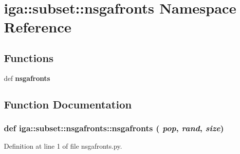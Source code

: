 \section{iga::subset::nsgafronts Namespace Reference}
\label{namespaceiga_1_1subset_1_1nsgafronts}


\subsection*{Functions}
\begin{CompactItemize}
\item 
def {\bf nsgafronts}
\end{CompactItemize}


\subsection{Function Documentation}
\subsubsection{\setlength{\rightskip}{0pt plus 5cm}def iga::subset::nsgafronts::nsgafronts ( {\em pop},  {\em rand},  {\em size})}\label{namespaceiga_1_1subset_1_1nsgafronts_2e5cde600c0e144987edd5a176579749}




Definition at line 1 of file nsgafronts.py.